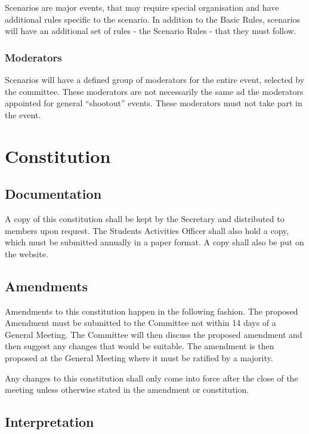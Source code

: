 \documentclass{report}
\begin{document}
Scenarios are major events, that may require special organisation and have additional rules specific to the scenario. In addition to the Basic Rules, scenarios will have an additional set of rules - the Scenario Rules - that they must follow.

	\subsection*{Moderators}
	
	Scenarios will have a defined group of moderators for the entire event, selected by the committee. These moderators are not necessarily the same ad the moderators appointed for general ``shootout'' events. These moderators must not take part in the event.

\chapter{Constitution}

\section{Documentation}

A copy of this constitution shall be kept by the Secretary and distributed to members upon request. The Students Activities Officer shall also hold a copy, which must be submitted annually in a paper format. A copy shall also be put on the website.

\section{Amendments}

Amendments to this constitution happen in the following fashion. The proposed Amendment must be submitted to the Committee not within 14 days of a General Meeting. The Committee will then discuss the proposed amendment and then suggest any changes that would be suitable. The amendment is then proposed at the General Meeting where it must be ratified by a majority.

Any changes to this constitution shall only come into force after the close of the meeting unless otherwise stated in the amendment or constitution.

\section{Interpretation}
\end{document}
